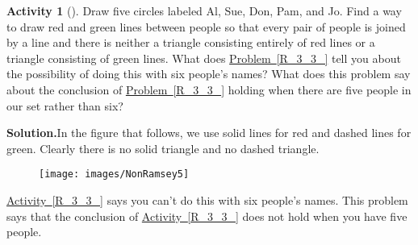 \documentclass[10pt,]{book}
\theoremstyle{plain}
\theoremstyle{definition}
\newtheorem{activity}[project]{Activity}
\numberwithin{equation}{chapter}
\begin{document}
\begin{activity}[]\label{notR_3_3_}
Draw five circles labeled Al, Sue, Don, Pam, and Jo. Find a way to draw red and green lines between people so that every pair of people is joined by a line and there is neither a triangle consisting entirely of red lines or a triangle consisting of green lines. What does \hyperref[R_3_3_]{Problem~\ref{R_3_3_}} tell you about the possibility of doing this with six people's names? What does this problem say about the conclusion of \hyperref[R_3_3_]{Problem~\ref{R_3_3_}} holding when there are five people in our set rather than six?%
\par\medskip\noindent%
\textbf{Solution.}\quad In the figure that follows, we use solid lines for red and dashed lines for green. Clearly there is no solid triangle and no dashed triangle.%
\begin{figure}
\centering
\texttt{[image: images/NonRamsey5]}
\end{figure}
\hyperref[R_3_3_]{Activity~\ref{R_3_3_}} says you can't do this with six people's names. This problem says that the conclusion of \hyperref[R_3_3_]{Activity~\ref{R_3_3_}} does not hold when you have five people.%
\end{activity}
\typeout{************************************************}
\typeout{************************************************}
\end{document}
